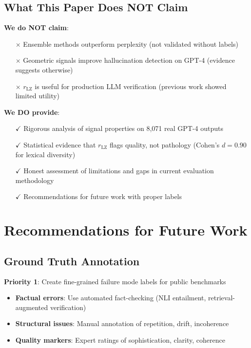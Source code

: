 \documentclass[11pt]{article}
\begin{document}
\subsection{What This Paper Does NOT Claim}

\textbf{We do NOT claim}:
\begin{itemize}
\item[$\times$] Ensemble methods outperform perplexity (not validated without labels)
\item[$\times$] Geometric signals improve hallucination detection on GPT-4 (evidence suggests otherwise)
\item[$\times$] $r_{\text{LZ}}$ is useful for production LLM verification (previous work showed limited utility)
\end{itemize}

\textbf{We DO provide}:
\begin{itemize}
\item[$\checkmark$] Rigorous analysis of signal properties on 8,071 real GPT-4 outputs
\item[$\checkmark$] Statistical evidence that $r_{\text{LZ}}$ flags quality, not pathology (Cohen's $d=0.90$ for lexical diversity)
\item[$\checkmark$] Honest assessment of limitations and gaps in current evaluation methodology
\item[$\checkmark$] Recommendations for future work with proper labels
\end{itemize}

\section{Recommendations for Future Work}
\label{sec:future}

\subsection{Ground Truth Annotation}

\textbf{Priority 1}: Create fine-grained failure mode labels for public benchmarks
\begin{itemize}
\item \textbf{Factual errors}: Use automated fact-checking (NLI entailment, retrieval-augmented verification)
\item \textbf{Structural issues}: Manual annotation of repetition, drift, incoherence
\item \textbf{Quality markers}: Expert ratings of sophistication, clarity, coherence
\end{itemize}
\end{document}
